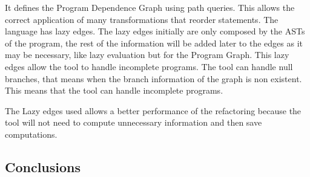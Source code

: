 It defines the Program Dependence Graph using path queries. 
This allows the correct application of many transformations that reorder statements.
The language has lazy edges. 
The lazy edges initially are only composed by the ASTs of the program, the rest of the information will be added later to the edges as it may be necessary, like lazy evaluation but for the Program Graph.
This lazy edges allow the tool to handle incomplete programs. 
The tool can handle null branches, that means when the branch information of the graph is non existent. This means that the tool can handle incomplete programs.


The Lazy edges used allows a better performance of the refactoring because the tool will not need to compute unnecessary information and then save computations.




\subsection{Conclusions}




